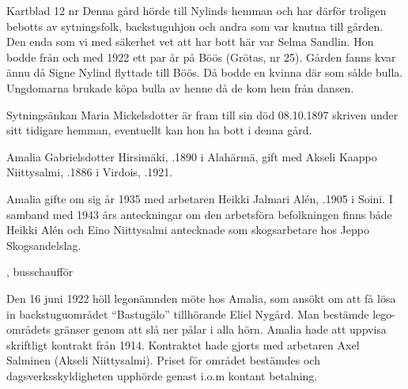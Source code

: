Kartblad 12   nr 
Denna gård hörde till Nylinds hemman och har därför troligen bebotts av sytningsfolk, backstuguhjon och andra som var knutna till gården. Den enda som vi med säkerhet vet att har bott här var Selma Sandlin. Hon bodde från och med 1922 ett par år på Böös (Grötas, nr 25). Gården fanns kvar ännu då Signe Nylind flyttade till Böös. Då bodde en kvinna där som sålde bulla. Ungdomarna brukade köpa bulla av henne då de kom hem från dansen.

Sytningsänkan Maria Mickelsdotter är fram till sin död 08.10.1897 skriven under sitt tidigare hemman, eventuellt kan hon ha bott i denna gård.



Amalia Gabrielsdotter Hirsimäki, .1890 i Alahärmä, gift med Akseli Kaappo Niittysalmi, .1886 i Virdois, .1921.

Amalia gifte om sig år 1935 med arbetaren Heikki Jalmari Alén, .1905 i Soini. I samband med 1943 års anteckningar om den arbetsföra befolkningen finns både Heikki Alén och Eino Niittysalmi antecknade som skogsarbetare hos Jeppo Skogsandelslag.
\begin{jhchildren}
  \item {}
  \item {}
  \item {}, busschaufför
  \item {}
  \item {}
  \item {}
  \item {}
  \item {}
\end{jhchildren}

Den 16 juni 1922 höll legonämnden möte hos Amalia, som ansökt om att få lösa in backstuguområdet ``Bastugälo'' tillhörande Eliel Nygård. Man bestämde lego-områdets gränser genom att slå ner pålar i alla hörn. Amalia hade att uppvisa skriftligt kontrakt från 1914. Kontraktet hade gjorts med arbetaren Axel Salminen (Akseli Niittysalmi). Priset för området bestämdes och dagsverksskyldigheten upphörde genast i.o.m kontant betalning.

